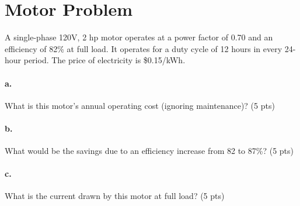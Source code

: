 \documentclass{article}
\newif\ifsolution
\newcommand{\solution}[1]
{\ifsolution
\vspace{10pt}
{\color{answer-color} #1}
\else\fi}
\begin{document}
\newcommand{\ufrac}[2]{\frac{\textrm{#1}}{\textrm{#2}}}
\section{Motor Problem}

A single-phase 120V, 2 hp motor operates at a power factor of 0.70 and
an efficiency of 82\% at full load.  It operates for a duty cycle of 12
hours in every 24-hour period.  The price of electricity is \$0.15/kWh.

\paragraph{a.} What is this motor's annual operating cost (ignoring maintenance)?
(5 pts)

\solution{
To begin, we estimate the electricity use over one year.  We then
multiply by the unit cost of electricity.
We calculate the electrical power for the motor from the delivered
mechanical power (2hp) and the efficiency.
$$ P = 2hp\cdot \ufrac{746W}{1hp} \ufrac{1 unit electrical power}{0.82
units mechanical power} = 1820 W$$
We then calculate the energy over the year.
$$ 1820W \cdot 365 days \cdot \ufrac{12 hours}{day} = 7969 kWh$$
Finally, the price paid for the electricity
$$7969 kWh \cdot 0.15 USD/kWh = 1195 \textrm{USD per year}$$
}

\paragraph{b.} What would be the savings due to an efficiency increase from 82 to
87\%? (5 pts)

\solution{
To find the cost for an 87\% efficient motore, we could repeat the
calculation above, or we could equivalently multiply by the ratio in
efficiencies.
$$ \$1195 \cdot \frac{0.82}{0.87} = \$1127 $$
The difference between these two figures is 68 USD per year.
}

\paragraph{c.} What is the current drawn by this motor at full load? (5 pts)

\solution{
The RMS current in the wire will be given by dividing the apparent power
by the voltage.  We find the apparent power by dividing the real power
by the power factor.
$$ S = \textrm{apparent power} = 1820 W \cdot \frac{1}{0.7} = 2.6 kVA $$
$$ I = S/V = 2600 VA / 120 = 21.7 A$$
If we had used the real power, we would have underestimated the current
in the wiring.
}
\end{document}
